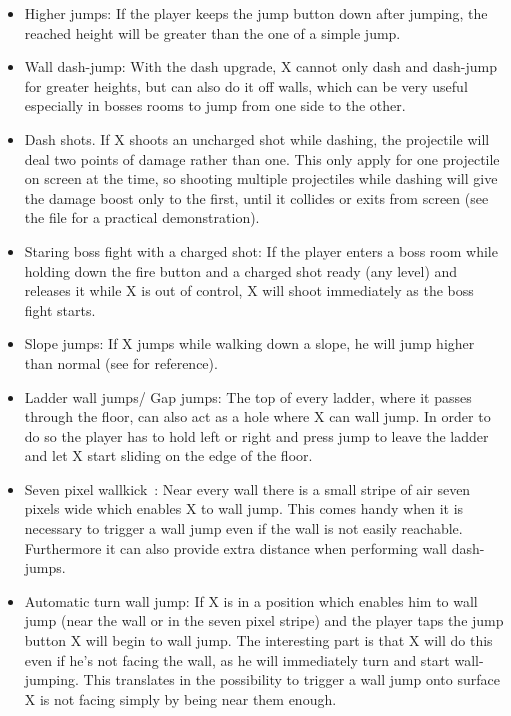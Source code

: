 \begin{itemize}
	\item Higher jumps: If the player keeps the jump button down after jumping, the reached height will be greater than the one of a simple jump.
	
	\item Wall dash-jump: With the dash upgrade, X cannot only dash and dash-jump for greater heights, but can also do it off walls, which can be very useful especially in bosses rooms to jump from one side to the other.
	
	\item Dash shots. If X shoots an uncharged shot while dashing, the projectile will deal two points of damage rather than one. This only apply for one projectile on screen at the time, so shooting multiple projectiles while dashing will give the damage boost only to the first, until it collides or exits from screen (see the file  for a practical demonstration).
	
	\item Staring boss fight with a charged shot: If the player enters a boss room while holding down the fire button and a charged shot ready (any level) and releases it while X is out of control, X will shoot immediately as the boss fight starts.
	
	\item Slope jumps: If X jumps while walking down a slope, he will jump higher than normal (see  for reference).
	
	\item Ladder wall jumps/ Gap jumps: The top of every ladder, where it passes through the floor, can also act as a hole where X can wall jump. In order to do so the player has to hold left or right and press jump to leave the ladder and let X start sliding on the edge of the floor.
	
	\item Seven pixel wallkick~\cite{MMX_RTA_wiki:basics}: Near every wall there is a small stripe of air seven pixels wide which enables X to wall jump. This comes handy when it is necessary to trigger a wall jump even if the wall is not easily reachable. Furthermore it can also provide extra distance when performing wall dash-jumps.
	
	\item Automatic turn wall jump: If X is in a position which enables him to wall jump (near the wall or in the seven pixel stripe) and the player taps the jump button X will begin to wall jump. The interesting part is that X will do this even if he's not facing the wall, as he will immediately turn and start wall-jumping. This translates in the possibility to trigger a wall jump onto surface X is not facing simply by being near them enough.
\end{itemize}


